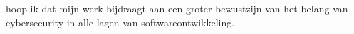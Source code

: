  hoop ik dat mijn werk bijdraagt aan een groter bewustzijn van het belang van cybersecurity in alle lagen van softwareontwikkeling. 
